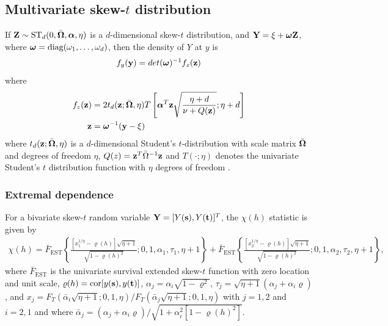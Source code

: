 \documentclass[11pt]{article}
\begin{document}
\subsection*{Multivariate skew-$t$ distribution}
If $\mbox{\bf Z} \sim \text{ST}_d(0, \bar{\mbox{\boldmath $\Omega$}}, \mbox{\boldmath $\alpha$}, \eta)$ is a $d$-dimensional skew-$t$ distribution, and $\mbox{\bf Y} = \xi + \mbox{\boldmath $\omega$} \mbox{\bf Z}$, where $\mbox{\boldmath $\omega$} = \text{diag}(\omega_1, \ldots, \omega_d)$, then the density of $Y$ at $y$ is
\begin{align}
  f_y(\mbox{\bf y}) = det(\mbox{\boldmath $\omega$})^{-1} f_z(\mbox{\bf z})
\end{align}
where
\begin{align}
  f_z(\mbox{\bf z}) &= 2 t_d(\mbox{\bf z}; \bar{\mbox{\boldmath $\Omega$}}, \eta) T \left[ \mbox{\boldmath $\alpha$}^T \mbox{\bf z} \sqrt{ \frac{\eta + d}{\nu + Q(\mbox{\bf z})} }; \eta + d\right] \\
  \mbox{\bf z} &= \mbox{\boldmath $\omega$}^{-1}(\mbox{\bf y} - \xi)
\end{align}
where $t_d(\mbox{\bf z}; \bar{\mbox{\boldmath $\Omega$}}, \eta)$ is a $d$-dimensional Student's $t$-distribution with scale matrix $\bar{\mbox{\boldmath $\Omega$}}$ and degrees of freedom $\eta$, $Q(z) = \mbox{\bf z}^T \bar{\Omega}^{-1}\mbox{\bf z}$ and $T(\cdot; \eta)$ denotes the univariate Student's $t$ distribution function with $\eta$ degrees of freedom \citep{Azzalini2014}.


\subsubsection*{Extremal dependence}
For a bivariate skew-$t$ random variable $\mbox{\bf Y} = [Y(\mbox{\bf s}), Y(\mbox{\bf t})]^T$, the $\chi(h)$ statistic \citep{Padoan2011} is given by
\begin{align} \label{eq:chiskew-t}
  \chi(h) = \bar{F}_{\text{EST}}\left\{ \frac{[x_1^{1 / \eta} - \varrho(h)] \sqrt{\eta + 1} }{\sqrt{1 - \varrho(h)^2}}; 0, 1, \alpha_1, \tau_1, \eta + 1 \right\} + \bar{F}_{\text{EST}}\left\{ \frac{ [x_2^{1 / \eta} - \varrho(h)] \sqrt{\eta + 1} }{ \sqrt{1 - \varrho(h)^2} }; 0, 1, \alpha_2, \tau_2, \eta + 1 \right\},
\end{align}
where $\bar{F}_{\text{EST}}$ is the univariate survival extended skew-$t$ function with zero location and unit scale, \hbox{$\varrho(h) = \text{cor}[y(\mbox{\bf s}), y(\mbox{\bf t})]$}, $\alpha_j = \alpha_i \sqrt{1 - \varrho^2}$, $\tau_j = \sqrt{\eta + 1}(\alpha_j + \alpha_i \varrho)$, and $x_j = F_T(\bar{\alpha}_i \sqrt{\eta + 1}; 0, 1, \eta) / F_T(\bar{\alpha}_j \sqrt{\eta + 1}; 0, 1, \eta)$ with $j = 1, 2$ and $i = 2, 1$ and where $\bar{\alpha}_j = (\alpha_j + \alpha_i \varrho) / \sqrt{ 1 + \alpha_i^2 [1 - \varrho(h)^2]}$.
\end{document}
